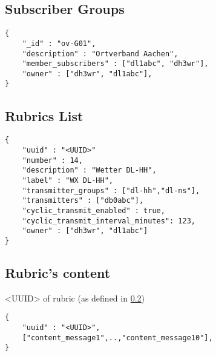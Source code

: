 \documentclass[a4paper]{article}
\begin{document}
\subsection{Subscriber Groups}

\begin{lstlisting}
{
	"_id" : "ov-G01",
	"description" : "Ortverband Aachen",
	"member_subscribers" : ["dl1abc", "dh3wr"],
    "owner" : ["dh3wr", "dl1abc"],
}
\end{lstlisting}

\subsection{Rubrics List}
\label{rubric_list}

\begin{lstlisting}
{
   	"uuid" : "<UUID>"
    "number" : 14,
    "description" : "Wetter DL-HH",
    "label" : "WX DL-HH",
    "transmitter_groups" : ["dl-hh","dl-ns"],
    "transmitters" : ["db0abc"],
	"cyclic_transmit_enabled" : true,
    "cyclic_transmit_interval_minutes": 123,
 	"owner" : ["dh3wr", "dl1abc"]
}
\end{lstlisting}

\subsection{Rubric's content}
<UUID> of rubric (as defined in \ref{rubric_list})

\begin{lstlisting}
{
	"uuid" : "<UUID>",
	["content_message1",..,"content_message10"],
}
\end{lstlisting}
\end{document}
